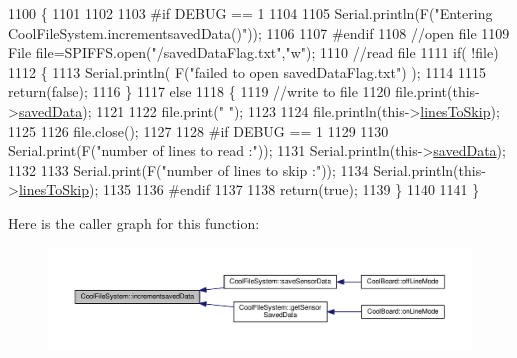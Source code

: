 \begin{DoxyCode}
1100 \{
1101 
1102 
1103 \textcolor{preprocessor}{#if DEBUG == 1}
1104     
1105     Serial.println(F(\textcolor{stringliteral}{"Entering CoolFileSystem.incrementsavedData()"}));  
1106     
1107 \textcolor{preprocessor}{#endif}
1108     \textcolor{comment}{//open file}
1109     File file=SPIFFS.open(\textcolor{stringliteral}{"/savedDataFlag.txt"},\textcolor{stringliteral}{"w"});    
1110     \textcolor{comment}{//read file}
1111     \textcolor{keywordflow}{if}( !file)  
1112     \{
1113         Serial.println( F(\textcolor{stringliteral}{"failed to open savedDataFlag.txt"}) );
1114         
1115         \textcolor{keywordflow}{return}(\textcolor{keyword}{false});      
1116     \}
1117     \textcolor{keywordflow}{else}
1118     \{       
1119         \textcolor{comment}{//write to file }
1120         file.print(this->\hyperlink{class_cool_file_system_ad9f5b739a32100f5f21270c3d9ee2b1d}{savedData});
1121         
1122         file.print(\textcolor{stringliteral}{" "});
1123         
1124         file.println(this->\hyperlink{class_cool_file_system_a84fdb6057e534b395512463daa28ea3c}{linesToSkip});
1125     
1126         file.close();
1127 
1128 \textcolor{preprocessor}{    #if DEBUG == 1}
1129 
1130         Serial.print(F(\textcolor{stringliteral}{"number of lines to read :"}));
1131         Serial.println(this->\hyperlink{class_cool_file_system_ad9f5b739a32100f5f21270c3d9ee2b1d}{savedData});
1132     
1133         Serial.print(F(\textcolor{stringliteral}{"number of lines to skip :"}));
1134         Serial.println(this->\hyperlink{class_cool_file_system_a84fdb6057e534b395512463daa28ea3c}{linesToSkip});
1135 
1136 \textcolor{preprocessor}{    #endif}
1137         
1138         \textcolor{keywordflow}{return}(\textcolor{keyword}{true});
1139     \}
1140     
1141 \}
\end{DoxyCode}
Here is the caller graph for this function\+:\nopagebreak
\begin{figure}[H]
\begin{center}
\leavevmode
\includegraphics[width=350pt]{db/d0c/class_cool_file_system_aae045125288f255f3e258073dcada2a6_icgraph}
\end{center}
\end{figure}
\mbox{\label{class_cool_file_system_ac86a40e7c3a1842f7342f698d34324f9}} 
